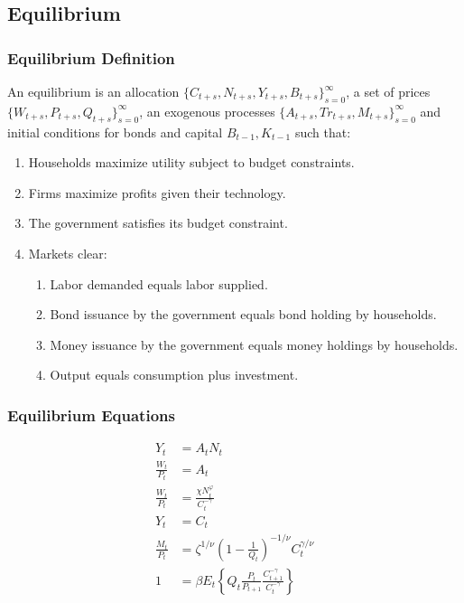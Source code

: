 \documentclass[english,xcolor=svgnames]{beamer}
\begin{document}
\subsection{Equilibrium}

\begin{frame}
\frametitle{Equilibrium Definition}
An equilibrium is an allocation $\{C_{t+s},N_{t+s},Y_{t+s},B_{t+s}\}_{s=0}^{\infty}$, a set of prices $\{W_{t+s},P_{t+s},Q_{t+s}\}_{s=0}^{\infty}$, an exogenous processes $\{A_{t+s},Tr_{t+s},M_{t+s}\}_{s=0}^{\infty}$ and initial conditions for bonds and capital $B_{t-1},K_{t-1}$ such that:
\begin{enumerate}[1.]
	\item Households maximize utility subject to budget constraints.
	\item Firms maximize profits given their technology.
	\item The government satisfies its budget constraint.
	\item Markets clear:
	\begin{enumerate}[3.1.]
		\item Labor demanded equals labor supplied.
		\item Bond issuance by the government equals bond holding by households.
		\item Money issuance by the government equals money holdings by households.
		\item Output equals consumption plus investment.
	\end{enumerate}
\end{enumerate}
\end{frame}


\begin{frame}
\frametitle{Equilibrium Equations}
\begin{align*}
	Y_t&=A_tN_{t}  \\
	\frac{W_t}{P_t}&= A_t  \\
	\frac{W_t}{P_t}&=\frac{\chi N_t^\varphi}{C_t^{-\gamma}} \\
	Y_t&=C_t \\
	\frac{M_t}{P_t}&=\zeta^{1/\nu}\left(1-\frac{1}{Q_t}\right)^{-1/\nu}C_{t}^{\gamma/\nu}\\
	1&=\beta E_t\left\{Q_t \frac{P_t}{P_{t+1}} \frac{C_{t+1}^{-\gamma}}{C_{t}^{-\gamma}}\right\} 
\end{align*}
\end{frame}
\end{document}
